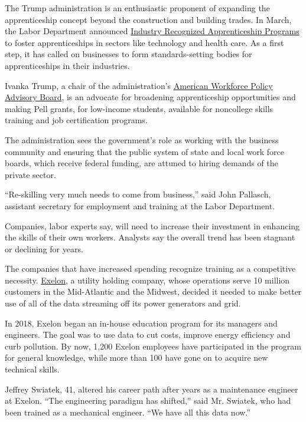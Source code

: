 The Trump administration is an enthusiastic proponent of expanding the
apprenticeship concept beyond the construction and building trades. In
March, the Labor Department announced
\href{https://www.dol.gov/newsroom/releases/eta/eta20200310}{Industry
Recognized Apprenticeship Programs} to foster apprenticeships in sectors
like technology and health care. As a first step, it has called on
businesses to form standards-setting bodies for apprenticeships in their
industries.

Ivanka Trump, a chair of the administration's
\href{https://www.commerce.gov/americanworker/american-workforce-policy-advisory-board}{American
Workforce Policy Advisory Board}, is an advocate for broadening
apprenticeship opportunities and making Pell grants, for low-income
students, available for noncollege skills training and job certification
programs.

The administration sees the government's role as working with the
business community and ensuring that the public system of state and
local work force boards, which receive federal funding, are attuned to
hiring demands of the private sector.

``Re-skilling very much needs to come from business,'' said John
Pallasch, assistant secretary for employment and training at the Labor
Department.

Companies, labor experts say, will need to increase their investment in
enhancing the skills of their own workers. Analysts say the overall
trend has been stagnant or declining for years.

The companies that have increased spending recognize training as a
competitive necessity. \href{https://www.exeloncorp.com/}{Exelon}, a
utility holding company, whose operations serve 10 million customers in
the Mid-Atlantic and the Midwest, decided it needed to make better use
of all of the data streaming off its power generators and grid.

In 2018, Exelon began an in-house education program for its managers and
engineers. The goal was to use data to cut costs, improve energy
efficiency and curb pollution. By now, 1,200 Exelon employees have
participated in the program for general knowledge, while more than 100
have gone on to acquire new technical skills.

Jeffrey Swiatek, 41, altered his career path after years as a
maintenance engineer at Exelon. ``The engineering paradigm has
shifted,'' said Mr. Swiatek, who had been trained as a mechanical
engineer. ``We have all this data now.''

